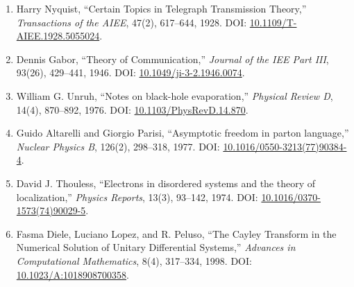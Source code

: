 \documentclass[
  a4paper,
]{ltjsarticle}
\providecommand{\tightlist}{%
  \setlength{\itemsep}{0pt}\setlength{\parskip}{0pt}}
\begin{document}
\begin{enumerate}
\def\labelenumi{\arabic{enumi}.}
\setcounter{enumi}{6}
\tightlist
\item
  Harry Nyquist, ``Certain Topics in Telegraph Transmission Theory,''
  \emph{Transactions of the AIEE}, 47(2), 617--644, 1928. DOI:
  \href{https://doi.org/10.1109/T-AIEE.1928.5055024}{10.1109/T-AIEE.1928.5055024}.
\item
  Dennis Gabor, ``Theory of Communication,'' \emph{Journal of the IEE
  Part III}, 93(26), 429--441, 1946. DOI:
  \href{https://doi.org/10.1049/ji-3-2.1946.0074}{10.1049/ji-3-2.1946.0074}.
\item
  William G. Unruh, ``Notes on black-hole evaporation,'' \emph{Physical
  Review D}, 14(4), 870--892, 1976. DOI:
  \href{https://doi.org/10.1103/PhysRevD.14.870}{10.1103/PhysRevD.14.870}.
\item
  Guido Altarelli and Giorgio Parisi, ``Asymptotic freedom in parton
  language,'' \emph{Nuclear Physics B}, 126(2), 298--318, 1977. DOI:
  \href{https://doi.org/10.1016/0550-3213(77)90384-4}{10.1016/0550-3213(77)90384-4}.
\item
  David J. Thouless, ``Electrons in disordered systems and the theory of
  localization,'' \emph{Physics Reports}, 13(3), 93--142, 1974. DOI:
  \href{https://doi.org/10.1016/0370-1573(74)90029-5}{10.1016/0370-1573(74)90029-5}.
\item
  Fasma Diele, Luciano Lopez, and R. Peluso, ``The Cayley Transform in
  the Numerical Solution of Unitary Differential Systems,''
  \emph{Advances in Computational Mathematics}, 8(4), 317--334, 1998.
  DOI:
  \href{https://doi.org/10.1023/A:1018908700358}{10.1023/A:1018908700358}.
\end{enumerate}
\end{document}
